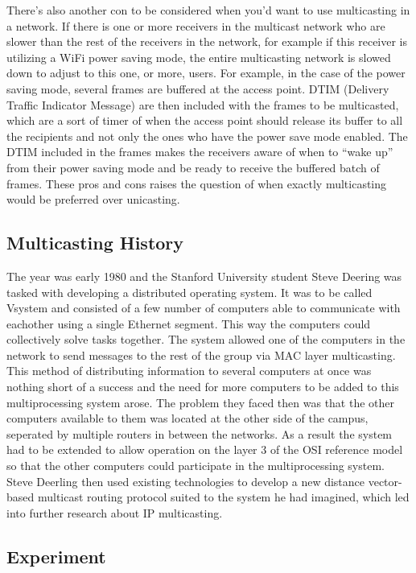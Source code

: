 \documentclass[9pt,a4paper]{acmproc}
\begin{document}
	There’s also another con to be considered when you’d want to use multicasting in a network. If there is one or more receivers in the multicast network who are slower than the rest of the receivers in the network, for example if this receiver is utilizing a WiFi power saving mode, the entire multicasting network is slowed down to adjust to this one, or more, users. For example, in the case of the power saving mode, several frames are buffered at the access point. DTIM (Delivery Traffic Indicator Message) are then included with the frames to be multicasted, which are a sort of timer of when the access point should release its buffer to all the recipients and not only the ones who have the power save mode enabled. The DTIM included in the frames makes the receivers aware of when to “wake up” from their power saving mode and be ready to receive the buffered batch of frames. \cite{impMult} 
	These pros and cons raises the question of when exactly multicasting would be preferred over unicasting.



\subsection{Multicasting History}

The year was early 1980 and the Stanford University student Steve Deering was tasked with developing a distributed operating system. It was to be called Vsystem and consisted of a few number of computers able to communicate with eachother using a single Ethernet segment. This way the computers could collectively solve tasks together. The system allowed one of the computers in the network to send messages to the rest of the group via MAC layer multicasting. This method of distributing information to several computers at once was nothing short of a success and the need for more computers to be added to this multiprocessing system arose. The problem they faced then was that the other computers available to them was located at the other side of the campus, seperated by multiple routers in between the networks. As a result the system had to be extended to allow operation on the layer 3 of the OSI reference model so that the other computers could participate in the multiprocessing system. Steve Deerling then used existing technologies to develop a new distance vector-based multicast routing protocol suited to the system he had imagined, which led into further research about IP multicasting. \cite[s.~7]{briefHist}


\subsection{Experiment}
\end{document}
